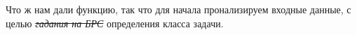 Что ж нам дали функцию, так что для начала пронализируем входные данные, с целью \textit{\sout{гадания на БРС}} определения класса задачи.

